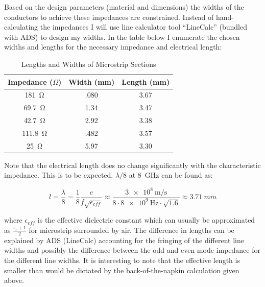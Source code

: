    Based on the design
    parameters (material and dimensions) the widths of the conductors to achieve
    these impedances are constrained. Instead of hand-calculating the impedances
    I will use line calculator tool ``LineCalc'' (bundled with ADS) to design my
    widths. In the table below I enumerate the chosen widths and lengths for the necessary
    impedance and electrical length:

    \begin{table}[H]
        \centering
        \caption{Lengths and Widths of Microstrip Sections}
        \label{tab:1a_microstrip_dimensions}
        \begin{tabular}{|c|c|c|}
            \hline Impedance ($\Omega$) & Width (mm) & Length (mm)  \\
            \hline \SI{181}{\ohm}       & .080       & 3.67         \\
            \hline \SI{69.7}{\ohm}      & 1.34       & 3.47         \\
            \hline \SI{42.7}{\ohm}      & 2.92       & 3.38         \\
            \hline \SI{111.8}{\ohm}     & .482       & 3.57         \\
            \hline \SI{25}{\ohm}        & 5.97       & 3.30         \\
            \hline
        \end{tabular}
    \end{table}

    Note that the electrical length does no change significantly with the
    characteristic impedance. This is to be expected. $\lambda/8$ at
    \SI{8}{\giga\hertz} can be found as:
    
    \[ 
        l = \frac{\lambda}{8}  = \frac{1}{8} \frac{c}{f\sqrt{\epsilon_{eff}}}
        \approx \frac{\SI{3e8}{\meter\per\second} }{8\cdot
        \SI{8e9}{\hertz}\cdot\sqrt{1.6} } \approx \SI{3.71}{mm} 
    \]
    
    where $\epsilon_{eff}$ is the effective dielectric constant which can
    usually be approximated as $\frac{\epsilon_r + 1}{2}$ for microstrip
    surrounded by air. The difference in lengths can be explained by ADS
    (LineCalc) accounting for the fringing of the different line widths and
    possibly the difference between the odd and even mode impedance for the
    different line widths. It is interesting to note that the effective length
    is smaller than would be dictated by the back-of-the-napkin calculation
    given above.

